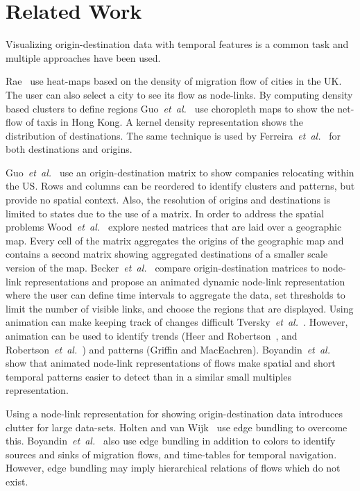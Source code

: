 \documentclass[a4paper,twocolumn]{article}
\author{Josua Krause}
\newcommand{\etal}{\emph{et~al.~}}
\begin{document}
\section*{Related Work}
Visualizing origin-destination data with temporal features
is a common task and multiple approaches have been used.

Rae~\cite{Rae2009} use heat-maps based on
the density of migration flow of cities in the UK.
The user can also select a city to see its flow as node-links.
By computing density based clusters to define regions
Guo~\etal\cite{Guo2012} use choropleth maps to show
the net-flow of taxis in Hong Kong.
A kernel density representation shows the distribution
of destinations.
The same technique is used by Ferreira~\etal\cite{Ferreira2013}
for both destinations and origins.

Guo~\etal\cite{Guo2006} use an origin-destination matrix
to show companies relocating within the US.
Rows and columns can be reordered to identify clusters
and patterns, but provide no spatial context.
Also, the resolution of origins and destinations is limited
to states due to the use of a matrix.
In order to address the spatial problems
Wood~\etal\cite{Wood2002} explore nested matrices
that are laid over a geographic map.
Every cell of the matrix aggregates the origins
of the geographic map and contains
a second matrix showing aggregated destinations of
a smaller scale version of the map.
Becker~\etal\cite{Becker1995} compare
origin-destination matrices to node-link representations
and propose an animated dynamic node-link representation
where the user can define time intervals to aggregate the data,
set thresholds to limit the number of visible links,
and choose the regions that are displayed.
Using animation can make keeping track of changes
difficult Tversky~\etal\cite{Tversky2002}.
However, animation can be used to
identify trends (Heer and Robertson~\cite{Heer2007},
and Robertson~\etal\cite{Robertson}) and
patterns (Griffin and MacEachren\cite{Griffin2006}).
Boyandin~\etal\cite{Boyandin2012} show that animated
node-link representations of flows make spatial and short temporal
patterns easier to detect than in
a similar small multiples representation.

Using a node-link representation for showing origin-destination
data introduces clutter for large data-sets.
Holten and van Wijk~\cite{Holten2009} use edge bundling to overcome this.
Boyandin~\etal\cite{Boyandin2008} also use edge bundling
in addition to colors to identify sources and sinks of migration
flows, and time-tables for temporal navigation.
However, edge bundling may imply hierarchical
relations of flows which do not exist.
\end{document}
